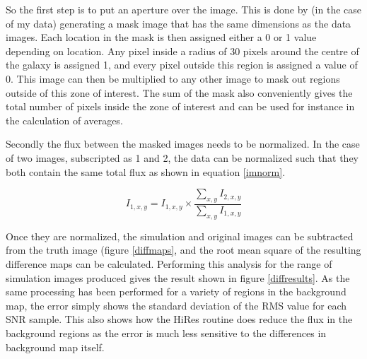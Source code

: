 So the first step is to put an aperture over the image. This is done by (in the case of my data) generating a mask image that has the same dimensions as the data images. Each location in the mask is then assigned either a 0 or 1 value depending on location. Any pixel inside a radius of 30 pixels around the centre of the galaxy is assigned 1, and every pixel outside this region is assigned a value of 0. This image can then be multiplied to any other image to mask out regions outside of this zone of interest. The sum of the mask also conveniently gives the total number of pixels inside the zone of interest and can be used for instance in the calculation of averages.

Secondly the flux between the masked images needs to be normalized. In the case of two images, subscripted as 1 and 2, the data can be normalized such that they both contain the same total flux as shown in equation \ref{imnorm}.

\begin{equation}
     I_{1,x,y} = I_{1,x,y} \times \frac{\sum\limits_{x,y}{I_{2,x,y}}}{\sum\limits_{x,y}{I_{1,x,y}}}
     \label{imnorm}
\end{equation}

Once they are normalized, the simulation and original images can be subtracted from the truth image (figure \ref{diffmaps}, and the root mean square of the resulting difference maps can be calculated. Performing this analysis for the range of simulation images produced gives the result shown in figure \ref{diffresults}. As the same processing has been performed for a variety of regions in the background map, the error simply shows the standard deviation of the RMS value for each SNR sample. This also shows how the HiRes routine does reduce the flux in the background regions as the error is much less sensitive to the differences in background map itself.


